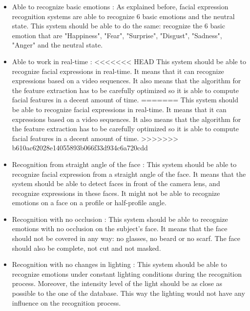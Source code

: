 \begin{itemize}
  \item Able to recognize basic emotions : 
  \noindent As explained before, facial expression recognition systems are able to recognize 6 basic emotions and the neutral state. This system should be able to do the same: recognize the 6 basic emotion that are "Happiness", "Fear", "Surprise", "Disgust", "Sadness", "Anger" and the neutral state.
\newline

  \item Able to work in real-time : 
<<<<<<< HEAD
  \noindent This system should be able to recognize facial expressions in real-time. It means that it can recognize expressions based on a video sequences. It also means that the algorithm for the feature extraction has to be carefully optimized so it is able to compute facial features in a decent amount of time. 
=======
  \noindent This system should be able to recognize facial expressions in real-time. It means that it can expressions based on a video sequences. It also means that the algorithm for the feature extraction has to be carefully optimized so it is able to compute facial features in a decent amount of time. 
>>>>>>> b610ac62028e14055893b066f33d934c6a720cdd
\newline

  \item Recognition from straight angle of the face : 
  \noindent This system should be able to recognize facial expression from a straight angle of the face. It means that the system should be able to detect faces in front of the camera lens, and recognize expressions in these faces. It might not be able to recognize emotions on a face on a profile or half-profile angle.
\newline

  \item Recognition with no occlusion : 
  \noindent This system should be able to recognize emotions with no occlusion on the subject's face. It means that the face should not be covered in any way: no glasses, no beard or no scarf. The face should also be complete, not cut and not masked.
\newline

  \item Recognition with no changes in lighting : 
  \noindent This system should be able to recognize emotions under constant lighting conditions during the recognition process. Moreover, the intensity level of the light should be as close as possible to the one of the database. This way the lighting would not have any influence on the recognition process.
\newline
\end{itemize}











